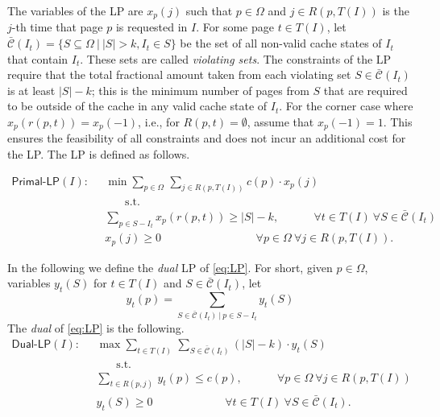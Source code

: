 \documentclass[11pt]{article}
\newcommand{\cC}{{\mathcal{C}}}
\newcommand{\om}{{\Omega}}
\newcommand{\bbc}{{\bar{\cC}(I_t)}}
\begin{document}
{The variables of the LP are $x_{p}(j)$ such that $p \in \om$ and $j \in R(p,T(I))$ is the $j$-th time that page $p$ is requested in $I$. For some page $t \in T(I)$, let $\bar{\cC}(I_t) = \{S \subseteq \om~|~|S|>k, I_t \in S\}$ be the set of all non-valid cache states of $I_t$ that contain $I_t$. These sets are called {\em violating sets}.    The constraints of the LP require that the total fractional amount taken from each violating set $S \in \bbc$ is at least $|S|-k$; this is the minimum number of pages  from $S$ that are required to be outside of the cache in any valid cache state of $I_t$. For the corner case where $x_p(r(p,t)) = x_p(-1)$, i.e., for $R(p,t) = \emptyset$, assume that $x_p(-1) = 1$. This ensures the feasibility of all constraints and does not incur an additional cost for the LP. The LP is defined as follows. 


\begin{equation}
	\label{eq:LP}
	\begin{aligned}
\textsf{Primal-LP}(I):~~~~~~~~	& \min \sum_{p \in \om~} \sum_{j \in R(p,T(I))} c(p) \cdot x_p(j)\\
	& ~~~~~~~~\text{s.t. }\\
 & \sum_{p \in S-I_t} x_p(r(p,t)) \geq |S|-k, 	~~~~~~~~~~~~~~\forall t \in T(I)~\forall S \in \bbc\\ 
& x_p(j) \geq 0 ~~~~~~~~~~~~~~~~~~~~~~~~~~~~~~~~~~~~~~	\forall p \in \om~\forall j \in R(p,T(I)).
	\end{aligned}
\end{equation} 

In the following we define the {\em dual} LP of \eqref{eq:LP}. For short, given $p \in \om$, variables $y_t(S)$ for $t \in T(I)$ and $S \in \bbc$, let $$y_t(p) = \sum_{S \in \bbc~|~p \in S-I_t} y_t(S)$$
The {\em dual} of \eqref{eq:LP} is the following. 
\begin{equation}
	\label{eq:dual}
	\begin{aligned}
		\textsf{Dual-LP}(I):~~~~~~~~	& \max \sum_{t \in T(I)~} \sum_{S \in \bbc} \left( |S|-k \right) \cdot y_t(S)\\
		& ~~~~~~~~\text{s.t. }\\
		& \sum_{t \in R(p,j)~} y_t(p) \leq c(p), 	~~~~~~~~~~~~~~\forall p \in \om~\forall j \in R(p,T(I))\\ 
		& y_t(S) \geq 0 ~~~~~~~~~~~~~~~~~~~~~~~~~~~~~	\forall t \in T(I) ~\forall S \in \bbc. 
	\end{aligned}
\end{equation} 


}
\end{document}
